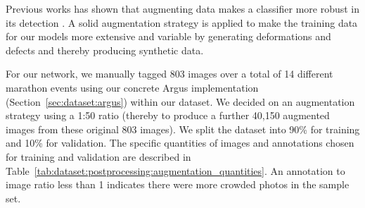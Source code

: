 Previous works has shown that augmenting data makes a classifier more robust in its detection \citep{Yaeger:1996tq,Baird:1992ih,Wong:2016cv}. A solid augmentation strategy is applied to make the training data for our models more extensive and variable by generating deformations and defects and thereby producing synthetic data.

For our network, we manually tagged 803 images over a total of 14 different marathon events using our concrete Argus implementation (Section~\ref{sec:dataset:argus}) within our dataset. We decided on an augmentation strategy using a 1:50 ratio (thereby to produce a further 40,150 augmented images from these original 803 images). We split the dataset into 90\% for training and 10\% for validation. The specific quantities of images and annotations chosen for training and validation are described in Table~\ref{tab:dataset:postprocessing:augmentation_quantities}. An annotation to image ratio less than 1 indicates there were more crowded photos in the sample set.

\begin{table}[t]
\centering
\caption[Breakdown of training and validation data]{Breakdown of images and annotations (runners) used for training and validation.}
\label{tab:dataset:postprocessing:augmentation_quantities}
\end{table}

